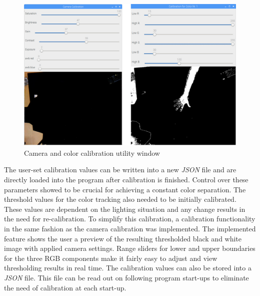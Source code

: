 \begin{figure}[H]
\includegraphics[width=\textwidth]{images/calib_windows.jpg}
\caption{Camera and color calibration utility window}
\label{fig:calibration_windows} 
\end{figure}
The user-set calibration values can be written into a new \textit{JSON} file and are directly loaded into the program after calibration is finished. Control over these parameters showed to be crucial for achieving a constant color separation. The threshold values for the color tracking also needed to be initially calibrated. These values are dependent on the lighting situation and any change results in the need for re-calibration. To simplify this calibration, a calibration functionality in the same fashion as the camera calibration was implemented. The implemented feature shows the user a preview of the resulting thresholded black and white image with applied camera settings. Range sliders for lower and upper boundaries for the three RGB components make it fairly easy to adjust and view thresholding results in real time. The calibration values can also be stored into a \textit{JSON} file. This file can be read out on following program start-ups to eliminate the need of calibration at each start-up.
